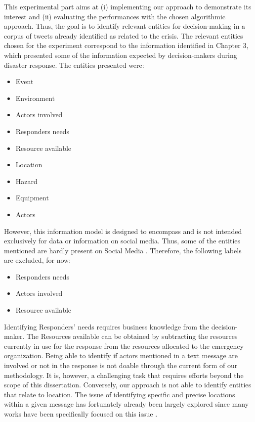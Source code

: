 This experimental part aims at (i) implementing our approach to demonstrate its interest and (ii) evaluating the performances with the chosen algorithmic approach.
Thus, the goal is to identify relevant entities for decision-making in a corpus of tweets already identified as related to the crisis.
The relevant entities chosen for the experiment correspond to the information identified in Chapter 3, which presented some of the information expected by decision-makers during disaster response.
The entities presented were:

\begin{itemize}
    \item Event
    \item Environment
    \item Actors involved
    \item Responders needs
    \item Resource available
    \item Location
    \item Hazard
    \item Equipment
    \item Actors
\end{itemize}

However, this information model is designed to encompass and is not intended exclusively for data or information on social media.
Thus, some of the entities mentioned are hardly present on Social Media \parencite{kropczynskiIdentifyingActionableInformation2018}.
Therefore, the following labels are excluded, for now:

\begin{itemize}
    \item Responders needs
    \item Actors involved
    \item Resource available
\end{itemize}

Identifying Responders' needs requires business knowledge from the decision-maker.
The Resources available can be obtained by subtracting the resources currently in use for the response from the resources allocated to the emergency organization.
Being able to identify if actors mentioned in a text message are involved or not in the response is not doable through the current form of our methodology.
It is, however, a challenging task that requires efforts beyond the scope of this dissertation.
Conversely, our approach is not able to identify entities that relate to location.
The issue of identifying specific and precise locations within a given message has fortunately already been largely explored since many works have been specifically focused on this issue \parencite{pezanowskiSensePlace3GeovisualFramework2018,maceachrenSenseplace2GeotwitterAnalytics2011}.

